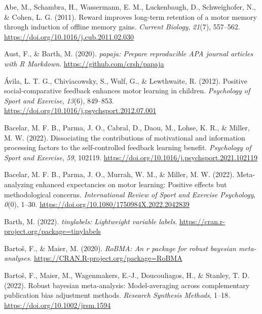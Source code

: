 \documentclass[
  man, donotrepeattitle,floatsintext]{apa7}
\newlength{\cslhangindent}
\newlength{\cslentryspacingunit} %
\newenvironment{CSLReferences}[2] %
 {%
  \setlength{\parindent}{0pt}
  \ifodd #1
  \let\oldpar\par
  \def\par{\hangindent=\cslhangindent\oldpar}
  \fi
  \setlength{\parskip}{#2\cslentryspacingunit}
 }%
 {}
\begin{document}
\hypertarget{refs}{}
\begin{CSLReferences}{1}{0}
\leavevmode{}%
Abe, M., Schambra, H., Wassermann, E. M., Luckenbaugh, D., Schweighofer, N., \& Cohen, L. G. (2011). Reward improves long-term retention of a motor memory through induction of offline memory gains. \emph{Current Biology}, \emph{21}(7), 557--562. \url{https://doi.org/10.1016/j.cub.2011.02.030}

\leavevmode{}%
Aust, F., \& Barth, M. (2020). \emph{{papaja}: {Prepare} reproducible {APA} journal articles with {R Markdown}}. \url{https://github.com/crsh/papaja}

\leavevmode{}%
Ávila, L. T. G., Chiviacowsky, S., Wulf, G., \& Lewthwaite, R. (2012). Positive social-comparative feedback enhances motor learning in children. \emph{Psychology of Sport and Exercise}, \emph{13}(6), 849--853. \url{https://doi.org/10.1016/j.psychsport.2012.07.001}

\leavevmode{}%
Bacelar, M. F. B., Parma, J. O., Cabral, D., Daou, M., Lohse, K. R., \& Miller, M. W. (2022). Dissociating the contributions of motivational and information processing factors to the self-controlled feedback learning benefit. \emph{Psychology of Sport and Exercise}, \emph{59}, 102119. \url{https://doi.org/10.1016/j.psychsport.2021.102119}

\leavevmode{}%
Bacelar, M. F. B., Parma, J. O., Murrah, W. M., \& Miller, M. W. (2022). Meta-analyzing enhanced expectancies on motor learning: Positive effects but methodological concerns. \emph{International Review of Sport and Exercise Psychology}, \emph{0}(0), 1--30. \url{https://doi.org/10.1080/1750984X.2022.2042839}

\leavevmode{}%
Barth, M. (2022). \emph{{tinylabels}: Lightweight variable labels}. \url{https://cran.r-project.org/package=tinylabels}

\leavevmode{}%
Bartoš, F., \& Maier, M. (2020). \emph{RoBMA: An r package for robust bayesian meta-analyses}. \url{https://CRAN.R-project.org/package=RoBMA}

\leavevmode{}%
Bartoš, F., Maier, M., Wagenmakers, E.-J., Doucouliagos, H., \& Stanley, T. D. (2022). Robust bayesian meta-analysis: Model-averaging across complementary publication bias adjustment methods. \emph{Research Synthesis Methods}, 1--18. \url{https://doi.org/10.1002/jrsm.1594}


\end{CSLReferences}
\end{document}
